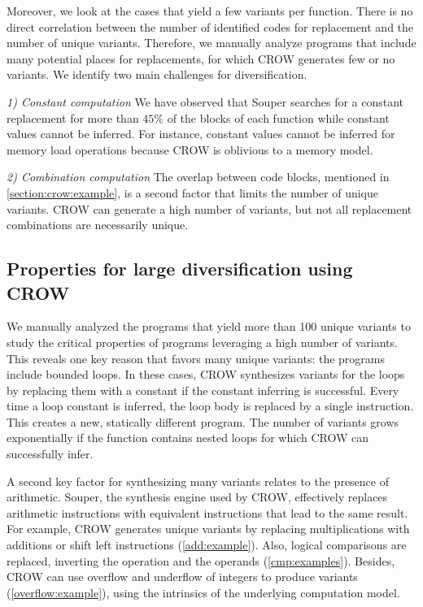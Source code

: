 Moreover, we look at the cases that yield a few variants per function. There is no direct correlation between the number of identified codes for replacement and the number of unique variants. Therefore, we manually analyze programs that include many potential places for replacements, for which CROW generates few or no variants. 
We identify two main challenges for diversification.

\emph{1) Constant computation}  We have observed that Souper searches for a constant replacement for more than $45\%$ of the blocks of each function while constant values cannot be inferred. For instance,  constant values cannot be inferred for memory load operations because CROW is oblivious to a memory model. 


\emph{2) Combination computation}  The overlap between code blocks, mentioned in \autoref{section:crow:example}, is a second factor that limits the number of unique variants. CROW can generate a high number of variants, but not all replacement combinations are necessarily unique. 



\subsection{Properties for large diversification using CROW}

We manually analyzed the programs that yield more than 100 unique variants to study the critical properties of programs leveraging a high number of variants.
This reveals one key reason that favors many unique variants: the programs include bounded loops. In these cases, CROW synthesizes variants for the loops by replacing them with a constant if the constant inferring is successful. Every time a loop constant is inferred, the loop body is replaced by a single instruction. This creates a new, statically different program. The number of variants grows exponentially if the function contains nested loops for which CROW can successfully infer. 

A second key factor for synthesizing many variants relates to the presence of arithmetic. Souper, the synthesis engine used by CROW, effectively replaces arithmetic instructions with equivalent instructions that lead to the same result. For example, CROW generates unique variants by replacing multiplications with additions or shift left instructions (\autoref{add:example}). Also, logical comparisons are replaced, inverting the operation and the operands (\autoref{cmp:examples}). Besides, CROW can use overflow and underflow of integers to produce variants (\autoref{overflow:example}), using the intrinsics of the underlying computation model.

